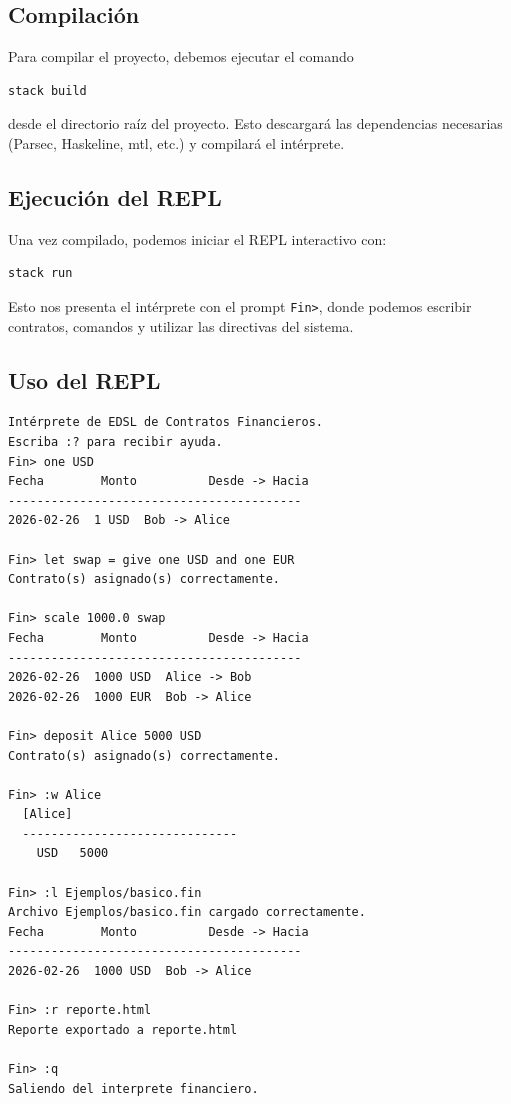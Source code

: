 \documentclass[a4paper, 12pt]{article}
\begin{document}
\subsection{Compilación}

Para compilar el proyecto, debemos ejecutar el comando

\begin{lstlisting}[style=replstyle, numbers=none]
stack build
\end{lstlisting}

desde el directorio raíz del proyecto. Esto descargará las dependencias necesarias (Parsec, Haskeline, mtl, etc.) y compilará el intérprete.

\subsection{Ejecución del REPL}

Una vez compilado, podemos iniciar el REPL interactivo con:

\begin{lstlisting}[style=replstyle, numbers=none]
stack run
\end{lstlisting}

Esto nos presenta el intérprete con el prompt \texttt{Fin>}, donde podemos escribir contratos, comandos y utilizar las directivas del sistema.

\subsection{Uso del REPL}

\begin{lstlisting}[style=replstyle, numbers=none, caption={Sesión de ejemplo en el REPL}]
Intérprete de EDSL de Contratos Financieros.
Escriba :? para recibir ayuda.
Fin> one USD
Fecha        Monto          Desde -> Hacia
-----------------------------------------
2026-02-26  1 USD  Bob -> Alice

Fin> let swap = give one USD and one EUR
Contrato(s) asignado(s) correctamente.

Fin> scale 1000.0 swap
Fecha        Monto          Desde -> Hacia
-----------------------------------------
2026-02-26  1000 USD  Alice -> Bob
2026-02-26  1000 EUR  Bob -> Alice

Fin> deposit Alice 5000 USD
Contrato(s) asignado(s) correctamente.

Fin> :w Alice
  [Alice]
  ------------------------------
    USD   5000

Fin> :l Ejemplos/basico.fin
Archivo Ejemplos/basico.fin cargado correctamente.
Fecha        Monto          Desde -> Hacia
-----------------------------------------
2026-02-26  1000 USD  Bob -> Alice

Fin> :r reporte.html
Reporte exportado a reporte.html

Fin> :q
Saliendo del interprete financiero.
\end{lstlisting}
\end{document}
